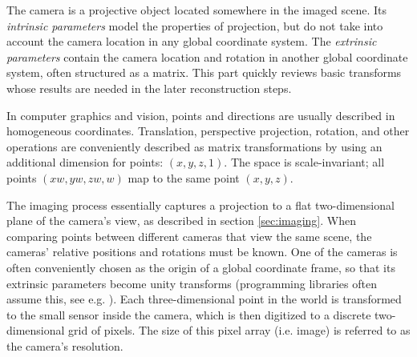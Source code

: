 
The camera is a projective object located somewhere in the imaged scene.
Its \emph{intrinsic parameters} model the properties of projection, but do not take into account the camera location in any global coordinate system.
The \emph{extrinsic parameters} contain the camera location and rotation in another global coordinate system, often structured as a matrix.
\cite{hartley03multiview,heyden2005multiple}
This part quickly reviews basic transforms whose results are needed in the later reconstruction steps.



In computer graphics and vision, points and directions are usually described in homogeneous coordinates.
Translation, perspective projection, rotation, and other operations are conveniently described as matrix transformations by using an additional dimension for points: $(x, y, z, 1)$.
The space is scale-invariant; all points $(xw, yw, zw, w)$ map to the same point $(x, y, z)$.
\cite{dubrofsky2009homography,hartley03multiview}


The imaging process essentially captures a projection to a flat two-dimensional plane of the camera's view, as described in section \ref{sec:imaging}.
When comparing points between different cameras that view the same scene, the cameras' relative positions and rotations must be known.
One of the cameras is often conveniently chosen as the origin of a global coordinate frame, so that its extrinsic parameters become unity transforms (programming libraries often assume this, see e.g. \cite{opencv}).
Each three-dimensional point in the world is transformed to the small sensor inside the camera, which is then digitized to a discrete two-dimensional grid of pixels. The size of this pixel array (i.e. image) is referred to as the camera's resolution.

